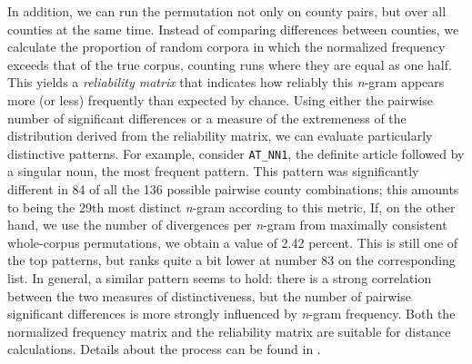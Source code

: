 \documentclass[output=paper]{LSP/langsci}
\begin{document}
In addition, we can run the permutation not only on county pairs, but over all counties at the same time.
Instead of comparing differences between counties, we calculate the proportion of random corpora in which the normalized frequency exceeds that of the true corpus, counting runs where they are equal as one half.
This yields a \emph{reliability matrix} that indicates how reliably this \emph{n}-gram appears more (or less) frequently than expected by chance.
Using either the pairwise number of significant differences or a measure of the extremeness of the distribution derived from the reliability matrix, we can evaluate particularly distinctive patterns.
For example, consider \texttt{AT\_NN1}, the definite article followed by a singular noun, the most frequent pattern.
This pattern was significantly different in 84 of all the 136 possible pairwise county combinations; this amounts to being the 29th most distinct \emph{n}-gram according to this metric,
If, on the other hand, we use the number of divergences per \emph{n}-gram from maximally consistent whole-corpus permutations, we obtain a value of 2.42 percent.
This is still one of the top patterns, but ranks quite a bit lower at number 83 on the corresponding list.
In general, a similar pattern seems to hold: there is a strong correlation between the two measures of distinctiveness, but the number of pairwise significant differences is more strongly influenced by \emph{n}-gram frequency.
Both the normalized frequency matrix and the reliability matrix are suitable for distance calculations.
Details about the process can be found in \citet[64-74]{wolk_integrating_2014}.
\end{document}
